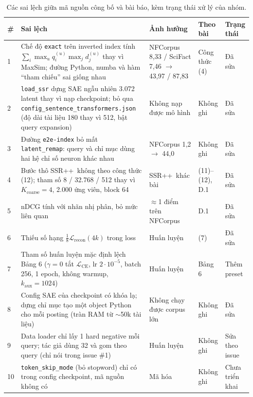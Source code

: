 \documentclass[a4paper,13pt]{extreport}
\theoremstyle{plain}
\newcommand{\ssrpp}{SSR++}
\begin{document}
\begin{table}[htbp]
\centering
\caption{Các sai lệch giữa mã nguồn công bố và bài báo, kèm trạng thái xử lý của nhóm.}
\label{tab:bugs}
\footnotesize
\begin{tabular}{P{0.3cm}P{5.8cm}P{3.4cm}P{1.7cm}P{2.1cm}}
\toprule
\textbf{\#} & \textbf{Sai lệch} & \textbf{Ảnh hưởng} & \textbf{Theo bài} & \textbf{Trạng thái}\\
 & Chế độ \texttt{exact} trên inverted index tính $\sum_i\max_u q_i^{(u)}\max_j d_j^{(u)}$ thay vì MaxSim; đường Python, numba và hàm ``tham chiếu'' sai giống nhau & NFCorpus 8,33 / SciFact 7,46 $\rightarrow$ 43,97 / 87,83 & Công thức (4) & Đã sửa\\
2 & \texttt{load\_ssr} dựng SAE ngẫu nhiên 3.072 latent thay vì nạp checkpoint; bỏ qua \texttt{config\_sentence\_transformers.json} (độ dài tài liệu 180 thay vì 512, bật query expansion) & Không nạp được mô hình & Không ghi & Đã sửa\\
3 & Đường \texttt{e2e-index} bỏ mất \texttt{latent\_remap}: query và chỉ mục dùng hai hệ chỉ số neuron khác nhau & NFCorpus 1,2 $\rightarrow$ 44,0 & Không ghi & Đã sửa\\
4 & Bước thô \ssrpp\ không theo công thức (12); tham số 8 / 32.768 / 512 thay vì $K_{\text{coarse}}=4$, 2.000 ứng viên, block 64 & \ssrpp\ khác bài & (11)--(12), D.1 & Đã sửa\\
5 & nDCG tính với nhãn nhị phân, bỏ mức liên quan & $\approx$1 điểm trên NFCorpus & D.1 & Đã sửa\\
6 & Thiếu số hạng $\frac18\mathcal{L}_{\text{recon}}(4k)$ trong loss & Huấn luyện & (7) & Đã sửa\\
7 & Tham số huấn luyện mặc định lệch Bảng 6 ($\gamma=0$ tắt $\mathcal{L}_{\text{CE}}$, lr $2\cdot10^{-5}$, batch 256, 1 epoch, không warmup, $k_{\text{aux}}=1024$) & Huấn luyện & Bảng 6 & Thêm preset\\
8 & Config SAE của checkpoint có khóa lạ; dựng chỉ mục tạo một object Python cho mỗi posting (tràn RAM từ $\sim$50k tài liệu) & Không chạy được corpus lớn & Không ghi & Đã sửa\\
9 & Data loader chỉ lấy 1 hard negative mỗi query; tác giả dùng 32 và gom theo query (chỉ nói trong issue \#1) & Huấn luyện & Không ghi & Sửa theo issue\\
10 & \texttt{token\_skip\_mode} (bỏ stopword) chỉ có trong config checkpoint, mã nguồn không có & Mã hóa & Không ghi & Chưa triển khai\\
\bottomrule
\end{tabular}
\end{table}
\end{document}

